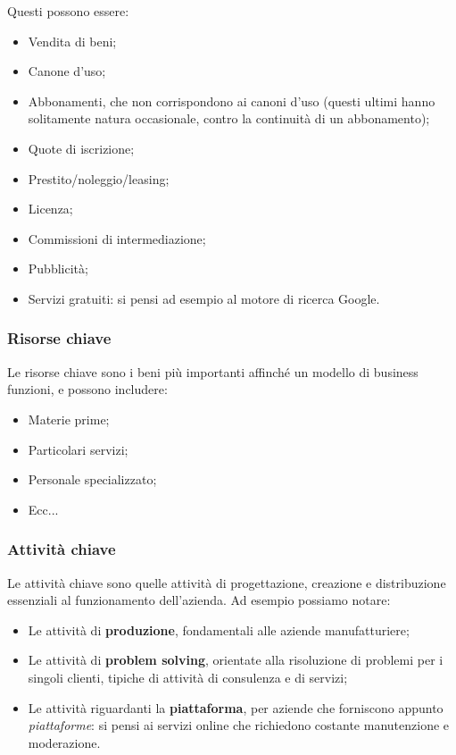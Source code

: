 \documentclass[a4paper,11pt]{article}
\begin{document}
Questi possono essere:
\begin{itemize}
	\item Vendita di beni;
	\item Canone d'uso;
	\item Abbonamenti, che non corrispondono ai canoni d'uso (questi ultimi hanno solitamente natura occasionale, contro la continuità di un abbonamento);
	\item Quote di iscrizione;
	\item Prestito/noleggio/leasing;
	\item Licenza;
	\item Commissioni di intermediazione;
	\item Pubblicità;
	\item Servizi gratuiti: si pensi ad esempio al motore di ricerca Google.
\end{itemize}

\subsubsection{Risorse chiave}
Le risorse chiave sono i beni più importanti affinché un modello di business funzioni, e possono includere:
\begin{itemize}
	\item Materie prime;
	\item Particolari servizi;
	\item Personale specializzato;
	\item Ecc...
\end{itemize}

\subsubsection{Attività chiave}
Le attività chiave sono quelle attività di progettazione, creazione e distribuzione essenziali al funzionamento dell'azienda.
Ad esempio possiamo notare:
\begin{itemize}
	\item Le attività di \textbf{produzione}, fondamentali alle aziende manufatturiere;
	\item Le attività di \textbf{problem solving}, orientate alla risoluzione di problemi per i singoli clienti, tipiche di attività di consulenza e di servizi;
	\item Le attività riguardanti la \textbf{piattaforma}, per aziende che forniscono appunto \textit{piattaforme}: si pensi ai servizi online che richiedono costante manutenzione e moderazione. 
\end{itemize}
\end{document}
